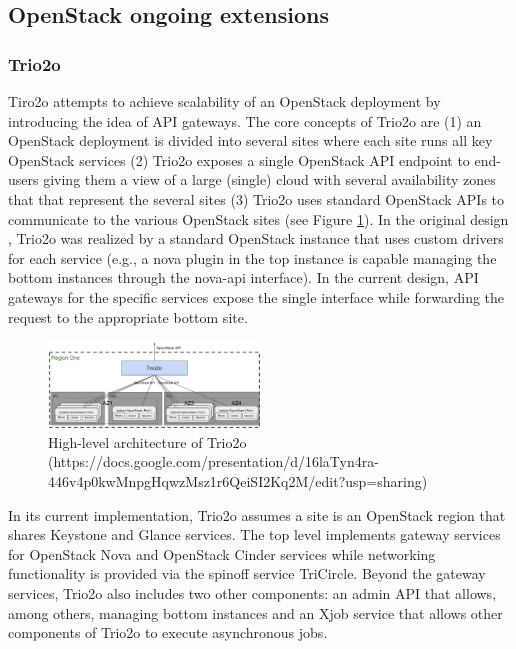 
\subsection{OpenStack ongoing extensions}
\label{subsec:ga_extensions}
\subsubsection{Trio2o} 
Tiro2o attempts to achieve scalability of an OpenStack deployment by introducing the idea of API gateways. The core concepts of Trio2o are (1) an OpenStack deployment is divided into several sites where each site runs all key OpenStack services (2) Trio2o exposes a single OpenStack API endpoint to end-users giving them a view of a large (single) cloud with several availability zones that that represent the several sites  (3) Trio2o uses standard OpenStack APIs to communicate to the various OpenStack sites (see Figure \ref{fig:Trio2oArch}). In the original design \cite{https://wiki.openstack.org/wiki/OpenStack_cascading_solution}, Trio2o was realized by a standard OpenStack instance that uses custom drivers for each service (e.g., a nova plugin in the top instance is capable managing the bottom instances through the nova-api interface). In the current design, API gateways for the specific services expose the single interface while forwarding the request to the appropriate bottom site.  

\begin{figure}[htbp]
\begin{center}
\includegraphics[width=0.5\textwidth]{trio2oarch}
\caption{High-level architecture of Trio2o (https://docs.google.com/presentation/d/16laTyn4ra-446v4p0kwMnpgHqwzMsz1r6QeiSI2Kq2M/edit?usp=sharing)}
\label{fig:Trio2oArch}
\end{center}
\end{figure}

In its current implementation, Trio2o assumes a site is an OpenStack region that shares Keystone and Glance services. The top level implements gateway services for OpenStack Nova and OpenStack Cinder services while networking functionality is provided via the spinoff service TriCircle. Beyond the gateway services, Trio2o also includes two other components: an admin API that allows, among others, managing bottom instances and an Xjob service that allows other components of Trio2o to execute asynchronous jobs. 

